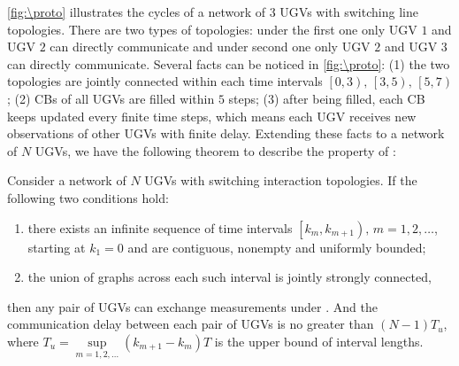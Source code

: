 	\cref{fig:\proto} illustrates the {\proto} cycles of a network of 3 UGVs with switching line topologies.
	There are two types of topologies: under the first one only UGV $1$ and UGV $2$ can directly communicate and under second one only UGV $2$ and UGV $3$ can directly communicate.
	Several facts can be noticed in \cref{fig:\proto}: 
	(1) the two topologies are jointly connected within each time intervals $\left[0,3 \right) ,\,\left[3,5 \right) ,\,\left[5,7 \right)$;
	(2)  CBs of all UGVs are filled within $5$ steps;
	(3) after being filled, each CB keeps updated every finite time steps, which means each UGV receives new observations of other UGVs with finite delay.
	Extending these facts to a network of $N$ UGVs, we have the following theorem to describe the property of \proto:
	
	\begin{thm}\label{prop1}
		Consider a network of $N$ UGVs with switching interaction topologies.
		If the following two conditions hold:
		\begin{enumerate}
			\item there exists an infinite sequence of time intervals $\left[k_m,k_{m+1} \right),\,m=1,2,\dots$, starting at $k_1=0$ and are contiguous, nonempty and uniformly bounded;
			\item the union of graphs across each such interval is jointly strongly connected,
		\end{enumerate}
		then any pair of UGVs can exchange measurements under \proto. And the communication delay between each pair of UGVs is no greater than \small$(N-1)T_u$\normalsize, where \small$T_u=\sup\limits_{m=1,2,\dots}\left( k_{m+1}-k_m\right) T$ \normalsize is the upper bound of interval lengths.
	\end{thm}
	
